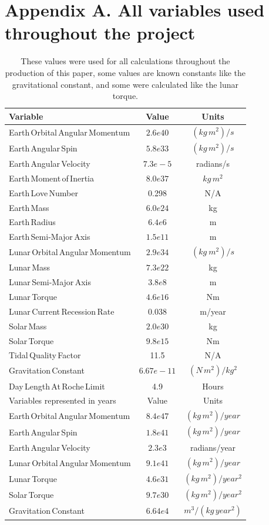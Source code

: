 \documentclass[final,5p,times,twocolumn,authoryear]{elsarticle}
\begin{document}
\section*{Appendix A. All variables used throughout the project}
\begin{table}[!h]
\centering
\begin{tabular}{l c c}
 \hline
 Variable & Value & Units \\ 
 \hline
 Earth\,Orbital\,Angular\,Momentum & $2.6e40$ & $(kg\,m^2)/s$ \\ 
 Earth\,Angular\,Spin & $5.8e33$ & $(kg\,m^2)/s$ \\ 
 Earth\,Angular\,Velocity & $7.3e-5$ & radians/s \\
 Earth\,Moment\,of\,Inertia & $8.0e37$ & $kg\,m^2$ \\
 Earth\,Love\,Number & 0.298 & N/A \\
 Earth\,Mass & $6.0e24$ & kg \\
 Earth\,Radius & $6.4e6$ & m \\
 Earth\,Semi-Major\,Axis & $1.5e11$ & m \\
 Lunar\,Orbital\,Angular\,Momentum & $2.9e34$ & $(kg\ m^2)/s$ \\
 Lunar\,Mass & $7.3e22$ & kg \\
 Lunar\,Semi-Major\,Axis & $3.8e8$ & m \\
 Lunar\,Torque & $4.6e16$ & Nm \\
 Lunar\,Current\,Recession\,Rate & 0.038 & m/year \\
 Solar\,Mass & $2.0e30$ & kg \\
 Solar\,Torque & $9.8e15$ & Nm \\
 Tidal\,Quality\,Factor & 11.5 & N/A \\
 Gravitation\,Constant & $6.67e-11$ & $(N\,m^2)/kg^2$ \\
 Day\,Length\,At\,Roche\,Limit & 4.9 & Hours \\
 \hline
 Variables represented in years & Value & Units \\ 
 \hline
 Earth\,Orbital\,Angular\,Momentum & $8.4e47$ & $(kg\,m^2)/year$ \\
 Earth\,Angular\,Spin & $1.8e41$ & $(kg\,m^2)/year$ \\ 
 Earth\,Angular\,Velocity & $2.3e3$ & radians/year \\
 Lunar\,Orbital\,Angular\,Momentum & $9.1e41$ & $(kg\,m^2)/year$ \\
 Lunar\,Torque & $4.6e31$ & $(kg\,m^2)/year^2$ \\
 Solar\,Torque & $9.7e30$ & $(kg\,m^2)/year^2$ \\
 Gravitation\,Constant & $6.64e4$ & $m^3/(kg\,year^2)$ \\
 \hline
\end{tabular}
\caption{These values were used for all calculations throughout the production of this paper, some values are known constants like the gravitational constant, and some were calculated like the lunar torque.
}
\end{table}
\end{document}
